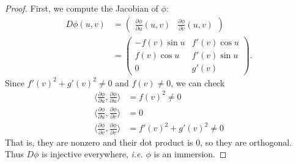 \documentclass[12pt]{article}
\begin{document}
\begin{proof}
First, we compute the Jacobian of $ \phi$:
\begin{align*}
	D \phi(u,v) &= \begin{pmatrix} \frac{\partial \phi}{\partial u}(u,v) & \frac{\partial \phi}{\partial v}(u,v)  \end{pmatrix} \\
		    &= \begin{pmatrix} -f(v) \sin u & f'(v) \cos u\\ f(v) \cos u & f'(v) \sin u\\ 0 & g'(v) \end{pmatrix} .
\end{align*}
Since $ f'(v)^2 + g'(v)^2 \neq 0$ and $ f(v) \neq 0$, we can check
\begin{align*}
	\langle \frac{\partial \phi}{\partial u}, \frac{\partial \phi}{\partial u}  \rangle &= f(v)^2 \neq 0 \\
	\langle \frac{\partial \phi}{\partial u}, \frac{\partial \phi}{\partial v}  \rangle &= 0 \\
	\langle \frac{\partial \phi}{\partial v} , \frac{\partial \phi}{\partial v}   \rangle &= f'(v)^2 + g'(v)^2 \neq 0
\end{align*}
That is, they are nonzero and their dot product is 0, so they are orthogonal. Thus $ D \phi$ is injective everywhere, \emph{i.e.} $ \phi$ is an immersion.


\end{proof}
\end{document}
